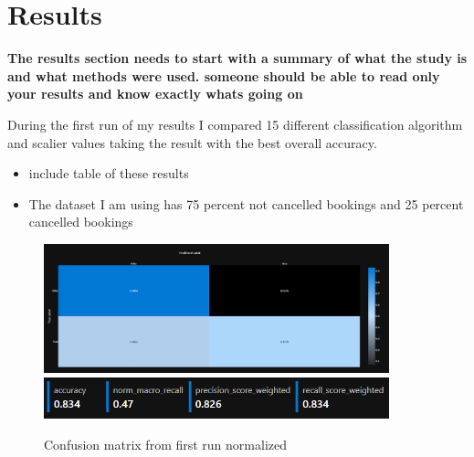 \chapter{Results}
\label{ch:results}

\textbf{The results section needs to start with a summary of what the study is and what methods were used. someone should be able to read only your results and know exactly whats going on}

During the first run of my results I compared 15 different classification algorithm and scalier values taking the result with the best overall accuracy.
\begin{itemize}
\item include table of these results
\item The dataset I am using has 75 percent not cancelled bookings and 25 percent cancelled bookings
\end{itemize}



\begin{figure}[hbt!]
 \includegraphics[width=10cm]{figures/azure_ml_confusion_matrix_xg.png}
 \includegraphics[width=10cm]{figures/xg_boost_scores.png}
 \caption{Confusion matrix from first run normalized}
\end{figure}


